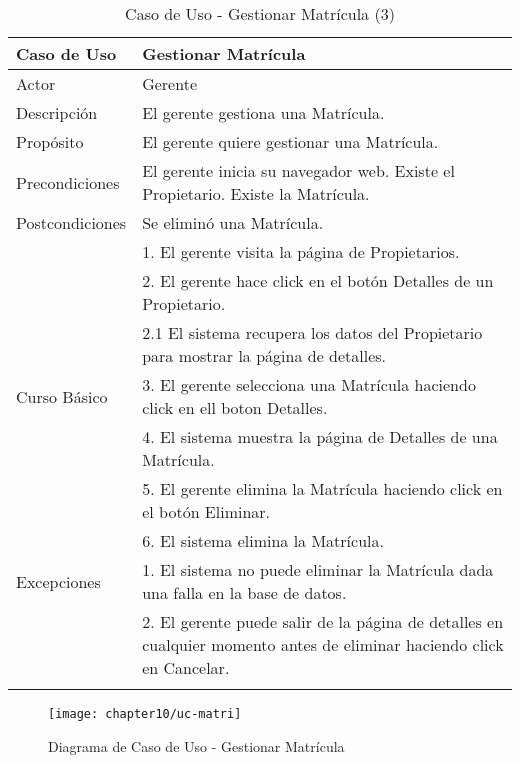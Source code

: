  \begin{longtable}{@{} p{3cm} p{10cm} @{}} \toprule
    \textbf{Caso de Uso}    & Gestionar Matrícula \\ \midrule
    Actor                   & Gerente \\ \cmidrule{1-2}
    Descripción             & El gerente gestiona una Matrícula. \\ \cmidrule{1-2}
    Propósito               & El gerente quiere gestionar una Matrícula. \\ \cmidrule{1-2}
    Precondiciones          & El gerente inicia su navegador web. Existe el Propietario. Existe la Matrícula. \\ \cmidrule{1-2} 
    Postcondiciones         & Se eliminó una Matrícula. \\ \cmidrule{1-2} 
                            & 1. El gerente visita la página de Propietarios. \\ 
                            & 2. El gerente hace click en el botón Detalles de un Propietario. \\
                            & 2.1 El sistema recupera los datos del Propietario para mostrar la página de detalles. \\
    Curso Básico            & 3. El gerente selecciona una Matrícula haciendo click en ell boton Detalles. \\
                            & 4. El sistema muestra la página de Detalles de una Matrícula. \\
                            & 5. El gerente elimina la Matrícula haciendo click en el botón Eliminar. \\
                            & 6. El sistema elimina la Matrícula. \\ \cmidrule{1-2}
    Excepciones             & 1. El sistema no puede eliminar la Matrícula dada una falla en la base de datos. \\
                            & 2. El gerente puede salir de la página de detalles en cualquier momento antes de eliminar haciendo click en Cancelar. \\ \bottomrule
   \caption{Caso de Uso - Gestionar Matrícula (3)} \label{tab:tabcu-matri3} \\
   \end{longtable}
  
 
    \begin{figure}[H]
        \centering
        \texttt{[image: chapter10/uc-matri]}
        \caption{Diagrama de Caso de Uso - Gestionar Matrícula}
        \label{fig:uc-matri}
    \end{figure}
    
